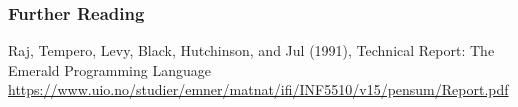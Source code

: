 \begin{frame}

\frametitle{Further Reading}

\begin{thebibliography}{Dijkstra, 1982}

 Raj, Tempero, Levy, Black,
Hutchinson, and Jul (1991), Technical Report: The Emerald Programming
Language\\ {\tiny
\url{https://www.uio.no/studier/emner/matnat/ifi/INF5510/v15/pensum/Report.pdf}}

\end{thebibliography}
\end{frame}

